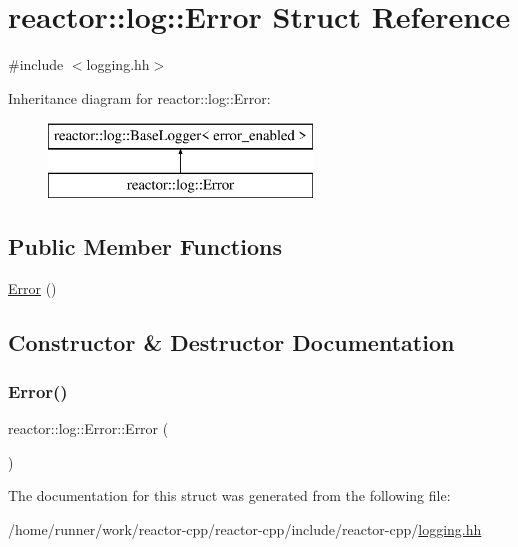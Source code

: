 \hypertarget{structreactor_1_1log_1_1Error}{}\section{reactor\+:\+:log\+:\+:Error Struct Reference}
\label{structreactor_1_1log_1_1Error}


{\ttfamily \#include $<$logging.\+hh$>$}

Inheritance diagram for reactor\+:\+:log\+:\+:Error\+:\begin{figure}[H]
\begin{center}
\leavevmode
\includegraphics[height=2.000000cm]{structreactor_1_1log_1_1Error}
\end{center}
\end{figure}
\subsection*{Public Member Functions}
\begin{DoxyCompactItemize}
\item 
\hyperlink{structreactor_1_1log_1_1Error_adf478efdd9543d086e970afd9d63de04}{Error} ()
\end{DoxyCompactItemize}


\subsection{Constructor \& Destructor Documentation}
\mbox{\label{structreactor_1_1log_1_1Error_adf478efdd9543d086e970afd9d63de04}} 
\subsubsection{\texorpdfstring{Error()}{Error()}}
{\footnotesize\ttfamily reactor\+::log\+::\+Error\+::\+Error (\begin{DoxyParamCaption}{ }\end{DoxyParamCaption})\hspace{0.3cm}{\ttfamily [inline]}}



The documentation for this struct was generated from the following file\+:\begin{DoxyCompactItemize}
\item 
/home/runner/work/reactor-\/cpp/reactor-\/cpp/include/reactor-\/cpp/\hyperlink{logging_8hh}{logging.\+hh}\end{DoxyCompactItemize}

